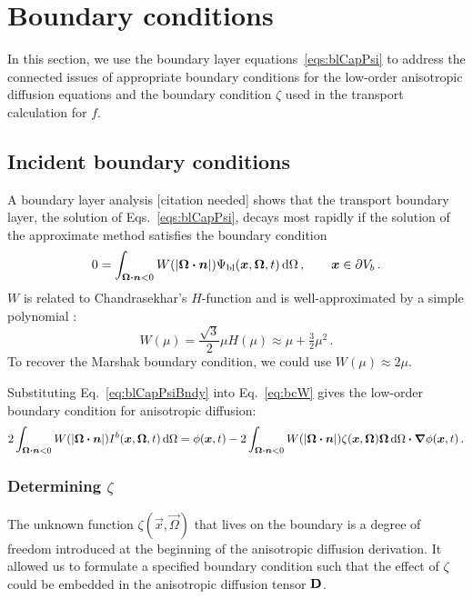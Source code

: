 \section{Boundary conditions}\label{sec:derBc}

In this section, we use the boundary layer equations~\eqref{eqs:blCapPsi} to
address the connected issues of appropriate boundary
conditions for the low-order anisotropic diffusion equations and the boundary
condition $\zeta$ used in the transport calculation for $f$.

\subsection{Incident boundary conditions}
A boundary layer analysis 
{\small [citation needed]}
shows that the transport boundary layer, the solution of
Eqs.~\eqref{eqs:blCapPsi}, decays most rapidly if the solution of the
approximate method satisfies the boundary condition
\begin{equation} \label{eq:bcW}
  0 = \int_{\bm{\Omega} \bm{\cdot} \bm{n} < 0} W(\left| \bm{\Omega} \bm{\cdot} \bm{n} \right|)
  \Psi_\mathrm{bl} (\bm{x}, \bm{\Omega}, t) \mathop{}\!\mathrm{d} \Omega\,,\qquad \bm{x} \in
  \partial V_b\,.
\end{equation}
$W$ is related to Chandrasekhar's $H$-function \cite{Cha1960} and is
well-approximated by a simple polynomial \cite{Mal1991}:
\begin{equation} \label{eq:chandraW}
  W(\mu) = \frac{\sqrt{3}}{2} \mu H(\mu)
  \approx \mu + \tfrac{3}{2} \mu^2 \,.
\end{equation}
To recover the Marshak boundary condition, we could use $W(\mu) \approx 2 \mu$.

Substituting Eq.~\eqref{eq:blCapPsiBndy} into Eq.~\eqref{eq:bcW} gives the
low-order boundary condition for anisotropic diffusion:
\begin{equation} \label{eq:bcInc1}
  2\int_{\bm{\Omega}\bm{\cdot} \bm{n} < 0}
  W(\left| \bm{\Omega} \bm{\cdot} \bm{n} \right|) I^b(\bm{x}, \bm{\Omega}, t) \mathop{}\!\mathrm{d}\Omega
  = \phi(\bm{x}, t)
  - 2\int_{\bm{\Omega}\bm{\cdot} \bm{n} < 0} W(\left| \bm{\Omega} \bm{\cdot} \bm{n} \right|)
  \zeta(\bm{x}, \bm{\Omega}) \bm{\Omega} \mathop{}\!\mathrm{d}\Omega
  \bm{\cdot} \bm{\nabla} \phi(\bm{x}, t) \,.
\end{equation}

\subsubsection{Determining $\zeta$}\label{sec:determiningZeta}
The unknown function $\zeta(\vec{x}, \vec{\Omega})$ that lives on the boundary
is a degree of freedom introduced at the beginning of the anisotropic
diffusion derivation. It allowed us to formulate a specified boundary condition
such that the effect of $\zeta$ could be embedded in the anisotropic diffusion
tensor $\mathbf{D}$.


